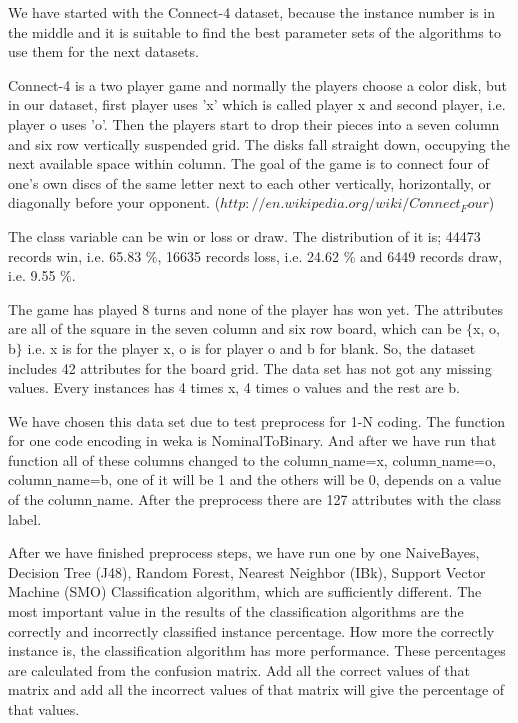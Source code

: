 \documentclass[a4paper]{article}
\begin{document}
We have started with the Connect-4 dataset, because the instance number is in the middle and it is suitable to find the best parameter sets of the algorithms to use them for the next datasets.

Connect-4 is a two player game and normally the players choose a color disk, but in our dataset, first player uses 'x' which is called player x and second player, i.e. player o uses 'o'. Then the players start to drop their pieces into a seven column and six row vertically suspended grid. The disks fall straight down, occupying the next available space within column. The goal of the game is to connect four of one's own discs of the same letter next to each other vertically, horizontally, or diagonally before your opponent. ($http://en.wikipedia.org/wiki/Connect_Four$) 

The class variable can be win or loss or draw. The distribution of it is; 44473 records win, i.e. 65.83 $\%$, 16635 records loss,  i.e. 24.62 $\%$ and 6449 records draw,  i.e. 9.55 $\%$.

The game has played 8 turns and none of the player has won yet. The attributes are all of the square in the seven column and six row board, which can be $\{$x, o, b$\}$ i.e. x is for the player x, o is for player o and b for blank. So, the dataset includes 42 attributes for the board grid. The data set has not got any missing values. Every instances has 4 times x, 4 times o values and the rest are b. 

We have chosen this data set due to test preprocess for 1-N coding. The function for one code encoding in weka is NominalToBinary. And after we have run that function all of these columns changed to the column$\_$name=x, column$\_$name=o, column$\_$name=b, one of it will be 1 and the others will be 0, depends on a value of the column$\_$name. After the preprocess there are 127 attributes with the class label. 

After we have finished preprocess steps, we have run one by one NaiveBayes, Decision Tree (J48), Random Forest, Nearest Neighbor (IBk), Support Vector Machine (SMO) Classification algorithm, which are sufficiently different. The most important value in the results of the classification algorithms are the correctly and incorrectly classified instance percentage. How more the correctly instance is, the classification algorithm has more performance. These percentages are calculated from the confusion matrix. Add all the correct values of that matrix and add all the incorrect values of that matrix will give the percentage of that values. 
\end{document}
